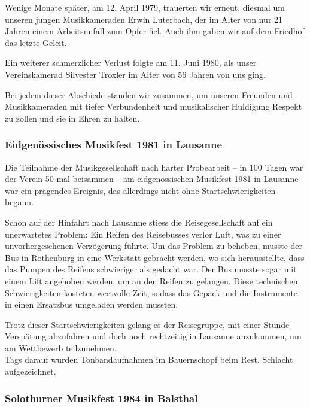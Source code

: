 \begin{history}
    Wenige Monate später, am 12. April 1979, trauerten wir erneut, diesmal um
    unseren jungen Musikkameraden Erwin Luterbach, der im Alter von nur 21
    Jahren einem Arbeitsunfall zum Opfer fiel. Auch ihm gaben wir auf dem
    Friedhof das letzte Geleit.

    Ein weiterer schmerzlicher Verlust folgte am 11. Juni 1980, als unser
    Vereinskamerad Silvester Troxler im Alter von 56 Jahren von uns ging.

    Bei jedem dieser Abschiede standen wir zusammen, um unseren Freunden und
    Musikkameraden mit tiefer Verbundenheit und musikalischer Huldigung Respekt
    zu zollen und sie in Ehren zu halten.

    \subsubsection*{Eidgenössisches Musikfest 1981 in Lausanne}

    Die Teilnahme der Musikgesellschaft nach harter Probearbeit -- in 100 Tagen
    war der Verein 50-mal beisammen -- am eidgenössischen Musikfest 1981 in
    Lausanne war ein prägendes Ereignis, das allerdings nicht ohne
    Startschwierigkeiten begann.

    Schon auf der Hinfahrt nach Lausanne stiess die Reisegesellschaft auf ein
    unerwartetes Problem: Ein Reifen des Reisebusses verlor Luft, was zu einer
    unvorhergesehenen Verzögerung führte. Um das Problem zu beheben, musste der
    Bus in Rothenburg in eine Werkstatt gebracht werden, wo sich herausstellte,
    dass das Pumpen des Reifens schwieriger als gedacht war. Der Bus musste
    sogar mit einem Lift angehoben werden, um an den Reifen zu gelangen. Diese
    technischen Schwierigkeiten kosteten wertvolle Zeit, sodass das Gepäck und
    die Instrumente in einen Ersatzbus umgeladen werden mussten.

    Trotz dieser Startschwierigkeiten gelang es der Reisegruppe, mit einer
    Stunde Verspätung abzufahren und doch noch rechtzeitig in Lausanne
    anzukommen, um am Wettbewerb teilzunehmen.\\

    Tags darauf wurden Tonbandaufnahmen im Bauernschopf beim Rest. Schlacht
    aufgezeichnet.


    \subsubsection*{Solothurner Musikfest 1984 in Balsthal}


\end{history}
